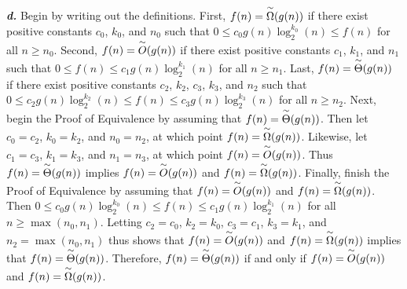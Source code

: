 \documentclass{article}
\begin{document}
\noindent\textbf{\textit{d.}} Begin by writing out the definitions. First, $f(n) = \overset{\small\sim}{\Omega}(g(n))$ if there exist positive constants $c_0$, $k_0$, and $n_0$ such that $0 \leq c_0 g(n) \log_2^{k_0}(n) \leq f(n)$ for all $n \geq n_0$. Second, $f(n) = \overset{\small\sim}{O}(g(n))$ if there exist positive constants $c_1$, $k_1$, and $n_1$ such that $0 \leq f(n) \leq c_1 g(n) \log_2^{k_1}(n)$ for all $n \geq n_1$. Last, $f(n) = \overset{\small\sim}{\Theta}(g(n))$ if there exist positive constants $c_2$, $k_2$, $c_3$, $k_3$, and $n_2$ such that $0 \leq c_2 g(n) \log_2^{k_2}(n) \leq f(n) \leq c_3 g(n) \log_2^{k_3}(n)$ for all $n \geq n_2$. Next, begin the Proof of Equivalence by assuming that $f(n) = \overset{\small\sim}{\Theta}(g(n))$. Then let $c_0 = c_2$, $k_0 = k_2$, and $n_0 = n_2$, at which point $f(n) = \overset{\small\sim}{\Omega}(g(n))$. Likewise, let $c_1 = c_3$, $k_1 = k_3$, and $n_1 = n_3$, at which point $f(n) = \overset{\small\sim}{O}(g(n))$. Thus $f(n) = \overset{\small\sim}{\Theta}(g(n))$ implies $f(n) = \overset{\small\sim}{O}(g(n))$ and $f(n) = \overset{\small\sim}{\Omega}(g(n))$. Finally, finish the Proof of Equivalence by assuming that $f(n) = \overset{\small\sim}{O}(g(n))$ and $f(n) = \overset{\small\sim}{\Omega}(g(n))$. Then $0 \leq c_0 g(n) \log_2^{k_0}(n) \leq f(n) \leq c_1 g(n) \log_2^{k_1}(n)$ for all $n \geq \max(n_0, n_1)$. Letting $c_2 = c_0$, $k_2 = k_0$, $c_3 = c_1$, $k_3 = k_1$, and $n_2 = \max(n_0, n_1)$ thus shows that $f(n) = \overset{\small\sim}{O}(g(n))$ and $f(n) = \overset{\small\sim}{\Omega}(g(n))$ implies that $f(n) = \overset{\small\sim}{\Theta}(g(n))$. Therefore, $f(n) = \overset{\small\sim}{\Theta}(g(n))$ if and only if $f(n) = \overset{\small\sim}{O}(g(n))$ and $f(n) = \overset{\small\sim}{\Omega}(g(n))$.
\end{document}
